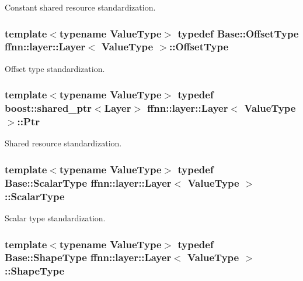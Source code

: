 Constant shared resource standardization. 

\hypertarget{classffnn_1_1layer_1_1_layer_a0e35ffd6e0657856f3a75323b2db9fcb}{
\subsubsection[{Offset\-Type}]{\setlength{\rightskip}{0pt plus 5cm}template$<$typename Value\-Type$>$ typedef {\bf Base\-::\-Offset\-Type} {\bf ffnn\-::layer\-::\-Layer}$<$ Value\-Type $>$\-::{\bf Offset\-Type}}}\label{classffnn_1_1layer_1_1_layer_a0e35ffd6e0657856f3a75323b2db9fcb}


Offset type standardization. 

\hypertarget{classffnn_1_1layer_1_1_layer_ab909b3fbacb9688059f9f22302f266f4}{
\subsubsection[{Ptr}]{\setlength{\rightskip}{0pt plus 5cm}template$<$typename Value\-Type$>$ typedef boost\-::shared\-\_\-ptr$<${\bf Layer}$>$ {\bf ffnn\-::layer\-::\-Layer}$<$ Value\-Type $>$\-::{\bf Ptr}}}\label{classffnn_1_1layer_1_1_layer_ab909b3fbacb9688059f9f22302f266f4}


Shared resource standardization. 

\hypertarget{classffnn_1_1layer_1_1_layer_ab63020e6e3d9270a748cb22c2432c93a}{
\subsubsection[{Scalar\-Type}]{\setlength{\rightskip}{0pt plus 5cm}template$<$typename Value\-Type$>$ typedef {\bf Base\-::\-Scalar\-Type} {\bf ffnn\-::layer\-::\-Layer}$<$ Value\-Type $>$\-::{\bf Scalar\-Type}}}\label{classffnn_1_1layer_1_1_layer_ab63020e6e3d9270a748cb22c2432c93a}


Scalar type standardization. 

\hypertarget{classffnn_1_1layer_1_1_layer_ab0b09d33e24cc8ea2b4e236ca4016ab9}{
\subsubsection[{Shape\-Type}]{\setlength{\rightskip}{0pt plus 5cm}template$<$typename Value\-Type$>$ typedef {\bf Base\-::\-Shape\-Type} {\bf ffnn\-::layer\-::\-Layer}$<$ Value\-Type $>$\-::{\bf Shape\-Type}}}\label{classffnn_1_1layer_1_1_layer_ab0b09d33e24cc8ea2b4e236ca4016ab9}


